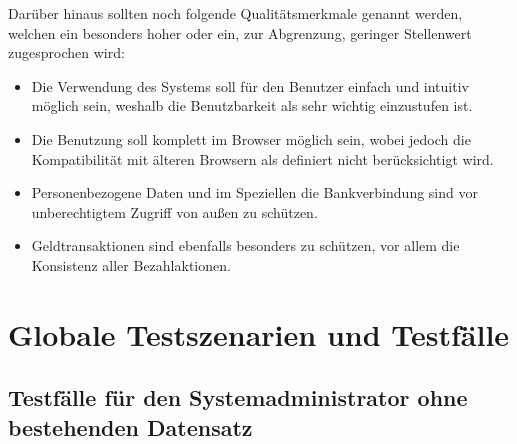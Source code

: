\documentclass[a4paper]{scrreprt}
\newcounter{Lc}
\newcounter{Hc}
\newcommand{\resetAllCounter}{\setcounter{Lc}{0}\setcounter{Hc}{1}}
\begin{document}
Darüber hinaus sollten noch folgende Qualitätsmerkmale genannt werden, welchen ein besonders hoher oder ein, zur Abgrenzung, geringer Stellenwert zugesprochen wird:
 \begin{itemize}
 	\item Die Verwendung des Systems soll für den Benutzer einfach und intuitiv möglich sein, weshalb die Benutzbarkeit als sehr wichtig einzustufen ist.
 	\item Die Benutzung soll komplett im Browser möglich sein, wobei jedoch die Kompatibilität mit älteren Browsern als definiert nicht berücksichtigt wird.
 	\item Personenbezogene Daten und im Speziellen die Bankverbindung sind vor unberechtigtem Zugriff von außen zu schützen.
 	\item Geldtransaktionen sind ebenfalls besonders zu schützen, vor allem die Konsistenz aller Bezahlaktionen.
 \end{itemize}
 
\resetAllCounter
\newcommand{\Test}[1]{\stepcounter{Lc}\textcolor{Brown}{\textbf{/T\arabic{Hc}0-\arabic{Lc}0/} #1} \\}
\newcommand{\RefFuncBlue}[1]{\textcolor{Blue}{\textbf{#1}}}
\newcommand{\RefFuncGreen}[1]{\textcolor{Green}{\textbf{#1}}}
\chapter{Globale Testszenarien und Testfälle}
 

	\section{Testfälle für den Systemadministrator ohne bestehenden Datensatz}
\end{document}
